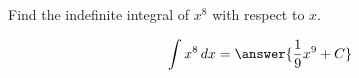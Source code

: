 \documentclass{ximera}
\author{Gregory Hartman \and Matthew Carr}
\begin{document}
\begin{exercise}


Find the indefinite integral of $x^8$ with respect to $x$.

\[
\int x^8\d x=\answer{\frac{1}{9}x^9+C}
\]
\begin{hint}

\end{hint}

\end{exercise}
\end{document}
